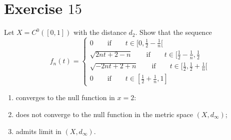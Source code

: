 \documentclass[a4paper, twoside, openany]{book}
\begin{document}
\section*{Exercise $15$}
Let $X = C^0([0,1])$ with the distance $d_2$. Show that the sequence
$$f_n(t) = \begin{cases}
				0 \qquad \textrm{if} \qquad t \in [0, \frac{1}{2} - \frac{1}{n}[ \\
				\sqrt{2nt +2 - n} \qquad \textrm{if} \qquad t \in [\frac{1}{2} - \frac{1}{n}, \frac{1}{2} \\
				\sqrt{-2n t + 2 + n} \qquad \textrm{if} \qquad t \in [\frac{1}{2}, \frac{1}{2} + \frac{1}{n}[ \\
				0 \qquad \textrm{if} \qquad t \in [\frac{1}{2} + \frac{1}{n}, 1] 
		   \end{cases}$$
\begin{enumerate}
\item converges to the null function in $x=2$:
\item does not converge to the null function in the metric space $(X, d_{\infty})$;
\item admits limit in $(X, d_{\infty})$.
\end{enumerate}
\end{document}

